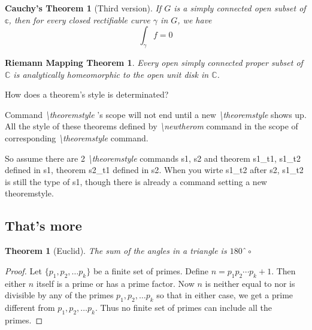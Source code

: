 \documentclass[a4paper, UTF8]{article}
\theoremstyle{definition}
\theoremstyle{remark}
\theoremstyle{plain}
\begin{document}
\theoremstyle{n1}
\newtheorem{ccc}{Cauchy's Theorem}
\begin{ccc}[Third version]
    If $G$ is a simply connected open subset of $\mathbb{c}$, then for every closed rectifiable curve $\gamma$ in $G$, we have
    \begin{equation*}
        \int_{\gamma}f=0
    \end{equation*}
\end{ccc}

\newtheorem{Riemann123}{Riemann Mapping Theorem}
\begin{Riemann123}
    Every open simply connected proper subset of $\mathbb{C}$ is analytically homeomorphic to the open unit disk in $\mathbb{C}$.
\end{Riemann123}
\newpage

How does a theorem's style is determinated?

Command {\itshape \textbackslash theoremstyle} 's scope will not end until a new {\itshape \textbackslash theoremstyle} shows up. All the style of these theorems defined by {\itshape \textbackslash newtherom} command in the scope of corresponding {\itshape \textbackslash theoremstyle} command.

So assume there are 2 {\itshape \textbackslash theoremstyle} commands {\rmfamily s1, s2} and theorem {\rmfamily s1\_t1, s1\_t2} defined in {\rmfamily s1}, theorem {\rmfamily s2\_t1} defined in {\rmfamily s2}. When you wirte {\rmfamily s1\_t2} after {\rmfamily s2}, {\rmfamily s1\_t2} is still the type of {\rmfamily s1}, though there is already a command setting a new theoremstyle.

\subsection{That's more}
\swapnumbers 
\theoremstyle{plain} 
\newtheorem{numfirstthm}{Theorem}[section]
\begin{numfirstthm}[Euclid]
    The sum of the angles in a triangle is $180ˆ\circ$
\end{numfirstthm}

\begin{proof} 
    Let $\{p_1,p_2,\dotsc p_k\}$ be a finite set of primes. Define $n=p_1p_2\dotsm p_k+1$. Then either $n$ itself is a prime or has a prime factor. Now $n$ is neither equal to nor is divisible by any of the primes $p_1,p_2,\dotsc p_k$ so that in either case, we get a prime different from $p_1,p_2,\dotsc p_k$. Thus no finite set of primes can include all the primes.
\end{proof}
\end{document}
